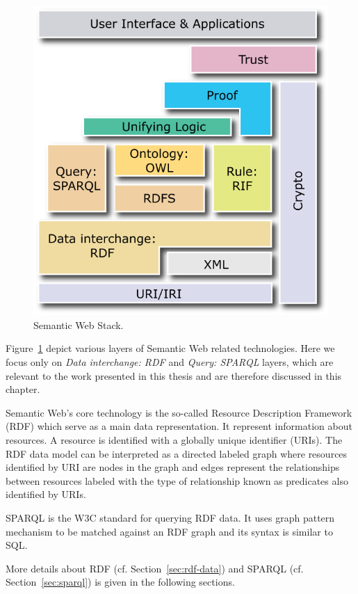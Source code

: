 \begin{figure}
\centering
\includegraphics[width=0.7\columnwidth]{images/2_preliminaries/sw-layer-cake-2007.png}
 \caption[Semantic Web Stack]{Semantic Web Stack\footnotemark.}
\label{fig:preliminaries-sw-layer-cake}
\end{figure}

Figure~\ref{fig:preliminaries-sw-layer-cake} depict various layers of Semantic Web related technologies.
Here we focus only on \textit{Data interchange: \gls{RDF}} and \textit{Query: \gls{SPARQL}} layers, which are relevant to the work presented in this thesis and are therefore discussed in this chapter.

Semantic Web's core technology is the so-called Resource Description Framework (\gls{RDF}) which serve as a main data representation.
It represent information about resources.
A resource is identified with a globally unique identifier (\gls{URI}s).
The \gls{RDF} data model can be interpreted as a directed labeled graph where resources identified by \gls{URI} are nodes in the graph and edges represent the relationships between resources labeled with the type of relationship known as predicates also identified by \gls{URI}s.

\gls{SPARQL} is the \gls{W3C} standard for querying \gls{RDF} data.
It uses graph pattern mechanism to be matched against an \gls{RDF} graph and its syntax is similar to SQL.

More details about \gls{RDF} (cf. Section~\ref{sec:rdf-data}) and \gls{SPARQL} (cf. Section~\ref{sec:sparql}) is given in the following sections.






